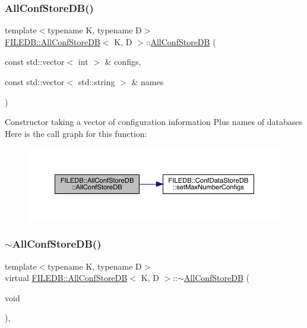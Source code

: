 \subsubsection{\texorpdfstring{AllConfStoreDB()}{AllConfStoreDB()}\hspace{0.1cm}{\footnotesize\ttfamily [3/6]}}
{\footnotesize\ttfamily template$<$typename K, typename D$>$ \\
\mbox{\hyperlink{classFILEDB_1_1AllConfStoreDB}{F\+I\+L\+E\+D\+B\+::\+All\+Conf\+Store\+DB}}$<$ K, D $>$\+::\mbox{\hyperlink{classFILEDB_1_1AllConfStoreDB}{All\+Conf\+Store\+DB}} (\begin{DoxyParamCaption}\item[{const std\+::vector$<$ int $>$ \&}]{configs,  }\item[{const std\+::vector$<$ std\+::string $>$ \&}]{names }\end{DoxyParamCaption})\hspace{0.3cm}{\ttfamily [inline]}}

Constructor taking a vector of configuration information Plus names of databases Here is the call graph for this function\+:
\nopagebreak
\begin{figure}[H]
\begin{center}
\leavevmode
\includegraphics[width=350pt]{df/db6/classFILEDB_1_1AllConfStoreDB_ab8b213578395f0ac7d436a82f4a26fe1_cgraph}
\end{center}
\end{figure}
\mbox{\label{classFILEDB_1_1AllConfStoreDB_ac5fe65eab60f20d7b8124c69c0bd5923}} 
\subsubsection{\texorpdfstring{$\sim$AllConfStoreDB()}{~AllConfStoreDB()}\hspace{0.1cm}{\footnotesize\ttfamily [1/2]}}
{\footnotesize\ttfamily template$<$typename K, typename D$>$ \\
virtual \mbox{\hyperlink{classFILEDB_1_1AllConfStoreDB}{F\+I\+L\+E\+D\+B\+::\+All\+Conf\+Store\+DB}}$<$ K, D $>$\+::$\sim$\mbox{\hyperlink{classFILEDB_1_1AllConfStoreDB}{All\+Conf\+Store\+DB}} (\begin{DoxyParamCaption}\item[{void}]{ }\end{DoxyParamCaption})\hspace{0.3cm}{\ttfamily [inline]}, {\ttfamily [virtual]}}

